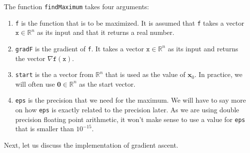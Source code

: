 \noindent
The function \texttt{findMaximum} takes four arguments:
\begin{enumerate}
\item \texttt{f} is the function that is to be maximized.  It is assumed that \texttt{f} takes a vector
      $\texttt{x}\in \mathbb{R}^n$ as its input and that it returns a real number.
\item \texttt{gradF} is the gradient of \texttt{f}.  It takes a vector
      $\texttt{x}\in \mathbb{R}^n$ as its input and returns the vector $\nabla \mathtt{f}(\mathtt{x})$.
\item \texttt{start} is the a vector from $\mathbb{R}^n$ that is used as the value of $\mathbf{x}_0$.  In
      practice, we will often use $\mathbf{0} \in \mathbb{R}^n$ as the start vector.
\item \texttt{eps} is the precision that we need for the maximum.  We will have to say more on how \texttt{eps}
      is exactly related to the precision later.  As we are using double precision floating point arithmetic, 
      it won't make sense to use a value for \texttt{eps} that is smaller than $10^{-15}$.
\end{enumerate}
Next, let us discuss the implementation of gradient ascent.

